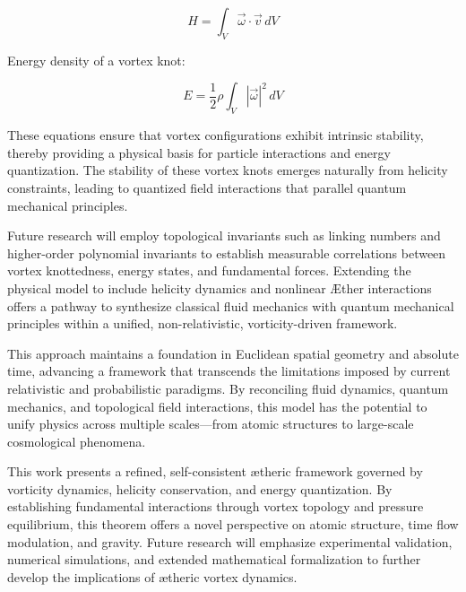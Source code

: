     \begin{equation*}
        H = \int_V \vec{\omega} \cdot \vec{v} \, dV\label{eq:HelicityConservation}
    \end{equation*}

Energy density of a vortex knot:

    \begin{equation*}
        E = \frac{1}{2} \rho \int_V |\vec{\omega}|^2 \, dV\label{eq:EnergyDensity}
    \end{equation*}

These equations ensure that vortex configurations exhibit intrinsic stability, thereby providing a physical basis for particle interactions and energy quantization. The stability of these vortex knots emerges naturally from helicity constraints, leading to quantized field interactions that parallel quantum mechanical principles.

Future research will employ topological invariants such as linking numbers and higher-order polynomial invariants to establish measurable correlations between vortex knottedness, energy states, and fundamental forces. Extending the physical model to include helicity dynamics and nonlinear Æther interactions offers a pathway to synthesize classical fluid mechanics with quantum mechanical principles within a unified, non-relativistic, vorticity-driven framework.

This approach maintains a foundation in Euclidean spatial geometry and absolute time, advancing a framework that transcends the limitations imposed by current relativistic and probabilistic paradigms. By reconciling fluid dynamics, quantum mechanics, and topological field interactions, this model has the potential to unify physics across multiple scales—from atomic structures to large-scale cosmological phenomena.


This work presents a refined, self-consistent ætheric framework governed by vorticity dynamics, helicity conservation, and energy quantization. By establishing fundamental interactions through vortex topology and pressure equilibrium, this theorem offers a novel perspective on atomic structure, time flow modulation, and gravity. Future research will emphasize experimental validation, numerical simulations, and extended mathematical formalization to further develop the implications of ætheric vortex dynamics.